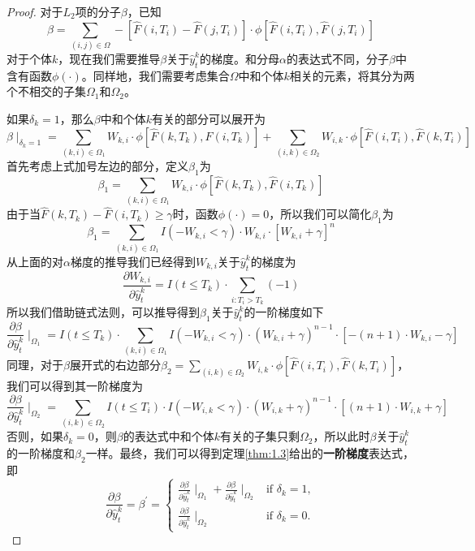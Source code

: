 \begin{proof}
对于$L_2$项的分子$\beta$，已知$$\beta = \sum_{(i,j)\in \Omega} -\left[\hat{F}(i, T_i) - \hat{F}(j, T_i)\right] \cdot \phi\left[ \hat{F}(i, T_i), \hat{F}(j, T_i) \right]$$ 对于个体$k$，现在我们需要推导$\beta$关于$\hat{y}_t^k$的梯度。和分母$\alpha$的表达式不同，分子$\beta$中含有函数$\phi(\cdot)$。同样地，我们需要考虑集合$\Omega$中和个体$k$相关的元素，将其分为两个不相交的子集$\Omega_1$和$\Omega_2$。

如果$\delta_k = 1$，那么$\beta$中和个体$k$有关的部分可以展开为$$\beta \mid_{\delta_k=1}=\sum_{(k,i)\in \Omega_1} W_{k,i}\cdot \phi\left[ \hat{F}(k, T_k), \hat{F}(i, T_k) \right] + \sum_{(i,k)\in \Omega_2} W_{i,k}\cdot \phi\left[ \hat{F}(i, T_i), \hat{F}(k, T_i) \right] $$ 首先考虑上式加号左边的部分，定义$\beta_1$为$$\beta_1 = \sum_{(k,i)\in \Omega_1} W_{k,i}\cdot \phi\left[ \hat{F}(k, T_k), \hat{F}(i, T_k) \right]$$ 由于当$\hat{F}(k, T_k) - \hat{F}(i, T_k) \ge \gamma$时，函数$\phi(\cdot)=0$，所以我们可以简化$\beta_1$为$$\beta_1 = \sum_{(k,i)\in \Omega_1} I(-W_{k,i} < \gamma) \cdot W_{k,i}\cdot [W_{k,i} + \gamma]^n $$ 从上面的对$\alpha$梯度的推导我们已经得到$W_{k,i}$关于$\hat{y}_t^k$的梯度为$$\frac{\partial W_{k,i}}{\partial \hat{y}_t^k} = I(t\le T_k)\cdot {\sum\limits_{i: T_i>T_k}(-1)}$$ 所以我们借助链式法则，可以推导得到$\beta_1$关于$\hat{y}_t^k$的一阶梯度如下$$
\frac{\partial \beta}{\partial \hat{y}_t^k} \mid_{\Omega_1} = I(t\le T_k)\cdot \sum\limits_{(k,i)\in \Omega_1} {I(-W_{k,i}<\gamma)\cdot (W_{k,i}+\gamma)^{n-1}\cdot [-(n+1)\cdot W_{k,i}-\gamma]}
$$ 同理，对于$\beta$展开式的右边部分$\beta_2=\sum_{(i,k)\in \Omega_2} W_{i,k}\cdot \phi\left[ \hat{F}(i, T_i), \hat{F}(k, T_i) \right]$，我们可以得到其一阶梯度为$$
\frac{\partial \beta}{\partial \hat{y}_t^k} \mid_{\Omega_2} = \sum\limits_{(i,k)\in \Omega_2} {I(t\le T_i)\cdot I(-W_{i,k}<\gamma)\cdot (W_{i,k}+\gamma)^{n-1}\cdot [(n+1)\cdot W_{i,k}+\gamma]}
$$ 否则，如果$\delta_k = 0$，则$\beta$的表达式中和个体$k$有关的子集只剩$\Omega_2$，所以此时$\beta$关于$\hat{y}_t^k$的一阶梯度和$\beta_2$一样。最终，我们可以得到定理\ref{thm:1.3}给出的\textbf{一阶梯度}表达式，即$$
\frac{\partial \beta}{\partial \hat{y}_t^k}=\beta^{'}=
\begin{cases}
\frac{\partial \beta}{\partial \hat{y}_t^k} \mid_{\Omega_1} + \frac{\partial \beta}{\partial \hat{y}_t^k} \mid_{\Omega_2} & \text{if } \delta_k = 1,\\
\frac{\partial \beta}{\partial \hat{y}_t^k} \mid_{\Omega_2} & \text{if } \delta_k = 0.
\end{cases}
$$
\end{proof}

